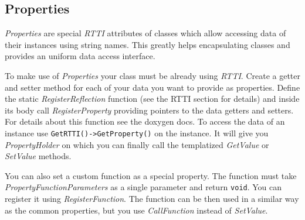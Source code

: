 \subsection{Properties}
\emph{Properties} are special \emph{RTTI} attributes of classes which allow accessing data of their instances using string names. This greatly helps encapsulating classes and provides an uniform data access interface.

To make use of \emph{Properties} your class must be already using \emph{RTTI}. Create a getter and setter method for each of your data you want to provide as properties. Define the static \emph{RegisterReflection} function (see the RTTI section for details) and inside its body call \emph{RegisterProperty} providing pointers to the data getters and setters. For details about this function see the doxygen docs. To access the data of an instance use \verb'GetRTTI()->GetProperty()' on the instance. It will give you \emph{PropertyHolder} on which you can finally call the templatized \emph{GetValue} or \emph{SetValue} methods.

You can also set a custom function as a special property. The function must take \emph{PropertyFunctionParameters} as a single parameter and return \verb'void'. You can register it using \emph{RegisterFunction}. The function can be then used in a similar way as the common properties, but you use \emph{CallFunction} instead of \emph{SetValue}.


%


